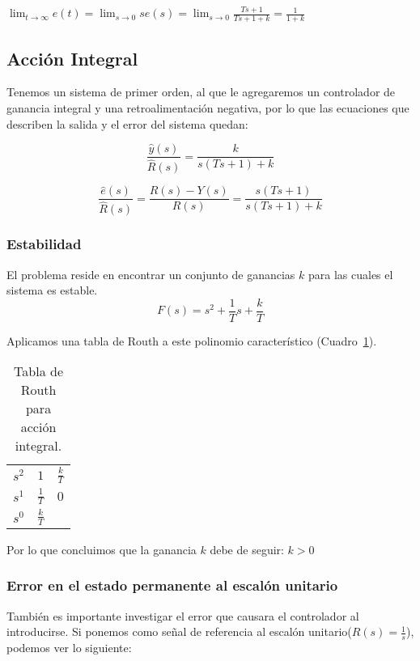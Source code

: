 \documentclass[12pt]{article}
\numberwithin{equation}{subsection}
\begin{document}
\begin{math}
\displaystyle \lim_{t \to \infty} e(t) = \lim_{s \to 0} s e(s) = \lim_{s \to 0} \frac{Ts + 1}{Ts + 1 + k} = \frac{1}{1 + k}
\end{math}

\subsection{Acción Integral}
Tenemos un sistema de primer orden, al que le agregaremos un controlador de ganancia integral y una retroalimentación negativa, por lo que las ecuaciones que describen la salida y el error del sistema quedan:

\begin{equation}
\frac{\hat{y}(s)}{\hat{R}(s)} = \frac{k}{s(Ts + 1) + k}
\end{equation}

\begin{equation}
\frac{\hat{e}(s)}{\hat{R}(s)} = \frac{R(s) - Y(s)}{R(s)} = \frac{s(Ts + 1)}{s(Ts + 1) + k}
\end{equation}

\subsubsection{Estabilidad}
El problema reside en encontrar un conjunto de ganancias $k$ para las cuales el sistema es estable.
\begin{equation}
F(s) = s^2 + \frac{1}{T} s + \frac{k}{T}
\end{equation}

Aplicamos una tabla de Routh a este polinomio característico (Cuadro~\ref{tab:AccionIntegral}).

\begin{table}[htbp]
\centering
\begin{tabular}{c|c c}
$s^2$ & $1$ & $\frac{k}{T}$ \\
$s^1$ & $\frac{1}{T}$ & $0$ \\
$s^0$ & $\frac{k}{T}$
\end{tabular}
\caption{\label{tab:AccionIntegral}Tabla de Routh para acción integral.}
\end{table}

Por lo que concluimos que la ganancia $k$ debe de seguir: $k>0$

\subsubsection{Error en el estado permanente al escalón unitario}
También es importante investigar el error que causara el controlador al introducirse. Si ponemos como señal de referencia al escalón unitario($R(s) = \frac{1}{s}$), podemos ver lo siguiente:
\end{document}
